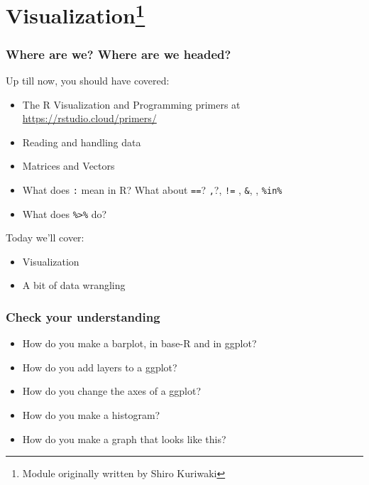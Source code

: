 \documentclass[]{book}
\providecommand{\tightlist}{%
  \setlength{\itemsep}{0pt}\setlength{\parskip}{0pt}}
\let\rmarkdownfootnote\footnote%
\def\footnote{\protect\rmarkdownfootnote}
\theoremstyle{definition}
\theoremstyle{definition}
\theoremstyle{definition}
\theoremstyle{remark}
\begin{document}
\chapter[Visualization]{\texorpdfstring{Visualization\footnote{Module
  originally written by Shiro Kuriwaki}}{Visualization}}\label{dataviz}

\subsection*{Where are we? Where are we
headed?}\label{where-are-we-where-are-we-headed-3}

Up till now, you should have covered:

\begin{itemize}
\tightlist
\item
  The R Visualization and Programming primers at
  \url{https://rstudio.cloud/primers/}
\item
  Reading and handling data
\item
  Matrices and Vectors
\item
  What does \texttt{:} mean in R? What about \texttt{==}? \texttt{,}?,
  \texttt{!=} , \texttt{\&}, \texttt{\textbar{}}, \texttt{\%in\%}
\item
  What does \texttt{\%\textgreater{}\%} do?
\end{itemize}

Today we'll cover:

\begin{itemize}
\tightlist
\item
  Visualization
\item
  A bit of data wrangling
\end{itemize}

\subsection*{Check your understanding}\label{check-your-understanding-1}

\begin{itemize}
\tightlist
\item
  How do you make a barplot, in base-R and in ggplot?
\item
  How do you add layers to a ggplot?
\item
  How do you change the axes of a ggplot?
\item
  How do you make a histogram?
\item
  How do you make a graph that looks like this?
\end{itemize}
\end{document}
